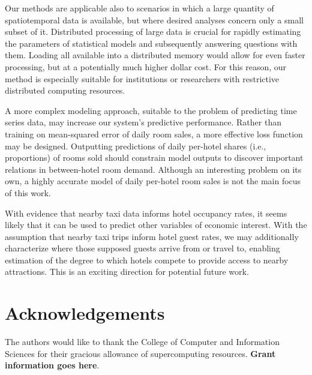 \documentclass[useAMS, usenatbib]{biom}
\begin{document}
Our methods are applicable also to scenarios in which a large quantity of spatiotemporal data is available, but where desired analyses concern only a small subset of it. Distributed processing of large data is crucial for rapidly estimating the parameters of statistical models and subsequently answering questions with them. Loading all available into a distributed memory would allow for even faster processing, but at a potentially much higher dollar cost. For this reason, our method is especially suitable for institutions or researchers with restrictive distributed computing resources.

A more complex modeling approach, suitable to the problem of predicting time series data, may increase our system's predictive performance. Rather than training on mean-squared error of daily room sales, a more effective loss function may be designed. Outputting predictions of daily per-hotel shares (i.e., proportions) of rooms sold should constrain model outputs to discover important relations in between-hotel room demand. Although an interesting problem on its own, a highly accurate model of daily per-hotel room sales is not the main focus of this work.

With evidence that nearby taxi data informs hotel occupancy rates, it seems likely that it can be used to predict other variables of economic interest. With the assumption that nearby taxi trips inform hotel guest rates, we may additionally characterize where those supposed guests arrive from or travel to, enabling estimation of the degree to which hotels compete to provide access to nearby attractions. This is an exciting direction for potential future work.

\backmatter

\section*{Acknowledgements}

The authors would like to thank the College of Computer and Information Sciences for their gracious allowance of supercomputing resources. \textbf{Grant information goes here}.

 


\label{lastpage}
\end{document}

